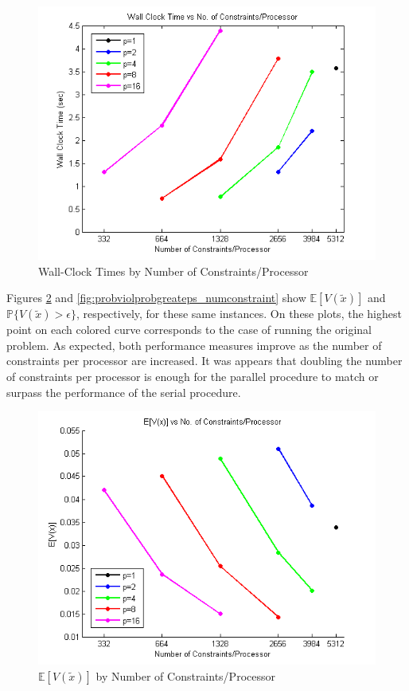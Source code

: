 \documentclass[12pt]{article}
\begin{document}
\begin{figure}[ht]
	\centering
		\includegraphics[scale=0.9]{../plot/figs/wct_numconstraint.png}
	\caption{Wall-Clock Times by Number of Constraints/Processor}
	\label{fig:wct_numconstraint}
\end{figure}

Figures \ref{fig:expviolprob_numconstraint} and \ref{fig:probviolprobgreateps_numconstraint} show $\mathbb{E}[V(\tilde{x})]$ and $\mathbb{P}\{V(\tilde{x}) > \epsilon \}$, respectively, for these same instances.
On these plots, the highest point on each colored curve corresponds to the case of running the original problem.
As expected, both performance measures improve as the number of constraints per processor are increased.
It was appears that doubling the number of constraints per processor is enough for the parallel procedure to match or surpass the performance of the serial procedure.

\begin{figure}[ht]
	\centering
		\includegraphics[scale=0.9]{../plot/figs/expviolprob_numconstraint.png}
	\caption{$\mathbb{E}[V(\tilde{x})]$ by Number of Constraints/Processor}
	\label{fig:expviolprob_numconstraint}
\end{figure}
\end{document}
